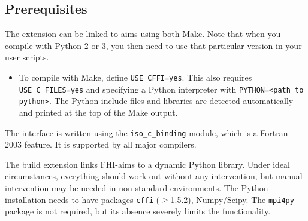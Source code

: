 
\subsection*{Prerequisites}
\label{sec:cffi-prereq}

The extension can be linked to aims using both Make.
Note that when you
compile with Python 2 or 3, you then need to use that particular version in
your user scripts.

\begin{itemize}

\item To compile with Make, define \verb+USE_CFFI=yes+.
This also requires
\verb+USE_C_FILES=yes+ and specifying a Python interpreter with
\verb+PYTHON=<path to python>+.
The Python include files and libraries are
detected automatically and printed at the top of the Make output.

\end{itemize}

The interface is written using the \verb+iso_c_binding+ module, which is
a Fortran 2003 feature.
It is supported by all major compilers.

The build extension links FHI-aims to a dynamic Python library.
Under ideal
circumstances, everything should work out without any intervention, but
manual intervention may be needed in non-standard environments.
The Python
installation needs to have packages \verb+cffi+ ($\geq$1.5.2), Numpy/Scipy.
The \verb+mpi4py+ package is not required, but its absence severely limits
the functionality.

